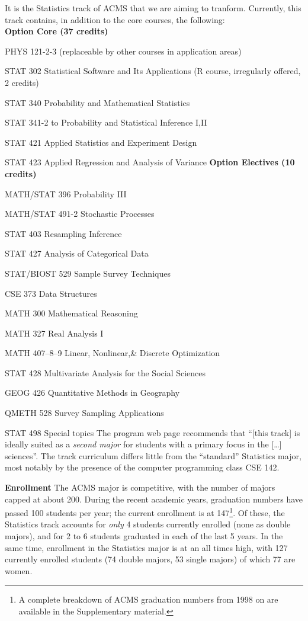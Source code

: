 It is the Statistics track of ACMS that we are aiming to
tranform. Currently, this track contains, in addition to the core
courses, the following:
\\
{\bf Option Core (37 credits)}
\bits
    \item {\sc PHYS 121-2-3} (replaceable by other courses in application areas)
    \item {\sc STAT 302} Statistical Software and Its Applications (R course, irregularly offered, 2 credits)
    \item {\sc STAT 340} Probability and Mathematical Statistics
    \item {\sc STAT 341-2} to Probability and Statistical Inference I,II
    \item {\sc STAT 421} Applied Statistics and Experiment Design
    \item {\sc STAT 423} Applied Regression and Analysis of Variance
\eits
{\bf Option Electives (10 credits)}
\bits
    \item {\sc MATH/STAT 396} Probability III
    \item {\sc MATH/STAT 491-2} Stochastic Processes
    \item {\sc STAT 403}  Resampling Inference
    \item {\sc STAT 427}  Analysis of Categorical Data
    \item {\sc STAT/BIOST 529} Sample Survey Techniques
    \item {\sc CSE 373} Data Structures
    \item {\sc MATH 300} Mathematical Reasoning
    \item {\sc MATH 327}  Real Analysis I
    \item {\sc MATH 407--8--9} Linear, Nonlinear,\& Discrete Optimization
    \item {\sc STAT 428} Multivariate Analysis for the Social Sciences
    \item {\sc GEOG 426} Quantitative Methods in Geography
    \item {\sc QMETH 528} Survey Sampling Applications
    \item {\sc STAT 498} Special topics
\eits
The program web page recommends that ``[this track] is ideally suited as a {\em second major} for students with a primary focus in the [\ldots] sciences''.
The track curriculum differs little from the ``standard'' Statistics major,
most notably by the presence of the computer programming class {\sc CSE 142}.

{\bf Enrollment} The ACMS major is competitive, with the number of
majors capped at about 200.  During the recent academic years,
graduation numbers have passed 100 students per year; the current
enrollment is at 147\footnote{A complete breakdown of ACMS graduation
  numbers from 1998 on are available in the Supplementary material.}.
Of these, the Statistics track accounts for {\it only} 4 students
currently enrolled (none as double majors), and for 2 to 6 students
graduated in each of the last 5 years. In the same time, enrollment in
the Statistics major is at an all times high, with 127 currently
enrolled students (74 double majors, 53 single majors) of which 77 are
women.

